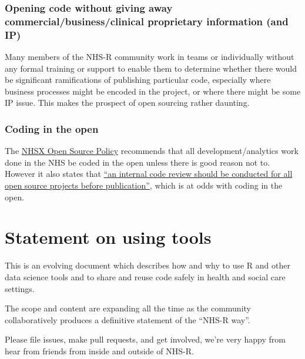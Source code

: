 \documentclass[
]{book}
\begin{document}
\hypertarget{opening-code-without-giving-away-commercialbusinessclinical-proprietary-information-and-ip}{%
\subsection{Opening code without giving away commercial/business/clinical proprietary information (and IP)}\label{opening-code-without-giving-away-commercialbusinessclinical-proprietary-information-and-ip}}

Many members of the NHS-R community work in teams or individually without any formal training or support to enable them to determine whether there would be significant ramifications of publishing particular code, especially where business processes might be encoded in the project, or where there might be some IP issue. This makes the prospect of open sourcing rather daunting.

\hypertarget{coding-in-the-open}{%
\subsection{Coding in the open}\label{coding-in-the-open}}

The \href{https://github.com/nhsx/open-source-policy}{NHSX Open Source Policy} recommends that all development/analytics work done in the NHS be coded in the open unless there is good reason not to. However it also states that \href{https://github.com/nhsx/open-source-policy/blob/main/open-source-policy.md\#e-assurance-requirements}{``an internal code review should be conducted for all open source projects before publication''}, which is at odds with coding in the open.

\newpage

\hypertarget{statement-on-using-tools}{%
\chapter{Statement on using tools}\label{statement-on-using-tools}}

This is an evolving document which describes how and why to use R and other data science tools and to share and reuse code safely in health and social care settings.

The scope and content are expanding all the time as the community collaboratively produces a definitive statement of the ``NHS-R way''.

Please file issues, make pull requests, and get involved, we're very happy from hear from friends from inside and outside of NHS-R.
\end{document}
